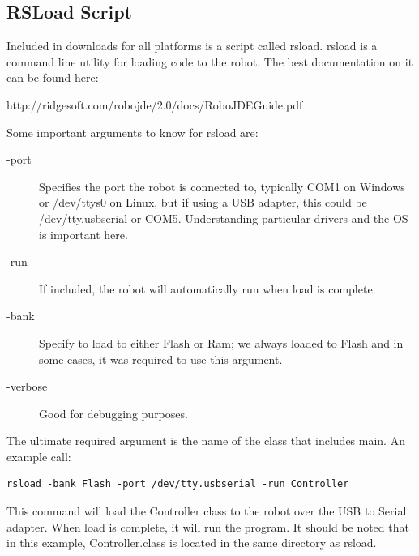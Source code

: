 \documentclass[12pt]{article}
\begin{document}
\subsection{RSLoad Script}
Included in downloads for all platforms is a script called rsload.  rsload is a command line utility for loading code to the robot.  The best documentation on it can be found here:\\
{\color{blue}\centerline{http://ridgesoft.com/robojde/2.0/docs/RoboJDEGuide.pdf}}
Some important arguments to know for rsload are:
\begin{description}

\item[-port] Specifies the port the robot is connected to, typically COM1 on Windows or /dev/ttys0 on Linux, but if using a USB adapter, this could be /dev/tty.usbserial or COM5.  Understanding particular drivers and the OS is important here.
\item[-run] If included, the robot will automatically run when load is complete.
\item[-bank] Specify to load to either Flash or Ram; we always loaded to Flash and in some cases, it was required to use this argument.
\item[-verbose] Good for debugging purposes.
\end{description}

The ultimate required argument is the name of the class that includes main.  An example call:
\begin{verbatim}
rsload -bank Flash -port /dev/tty.usbserial -run Controller
\end{verbatim}
This command will load the Controller class to the robot over the USB to Serial adapter.  When load is complete, it will run the program.  It should be noted that in this example, Controller.class is located in the same directory as rsload.
\end{document}
